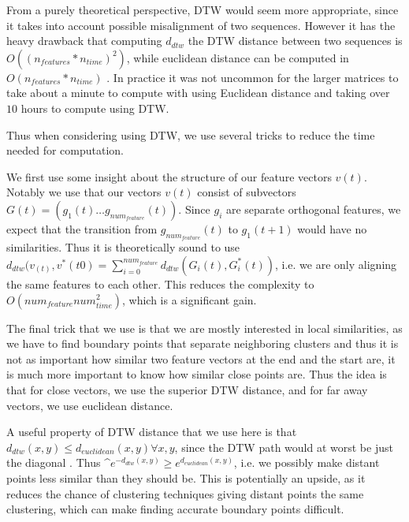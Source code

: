 From a purely theoretical perspective, DTW would seem more appropriate, since it takes into account possible misalignment of two sequences. However it has the heavy drawback that computing $d_{dtw}$ the DTW distance between two sequences is $O((n_{features}*n_{time})^2)$, while euclidean distance can be computed in $O(n_{features}*n_{time})$ . In practice it was not uncommon for the larger matrices to take about a minute to compute with using Euclidean distance and taking over $10$ hours to compute using DTW.

Thus when considering using DTW, we use several tricks to reduce the time needed for computation.

We first use some insight about the structure of our feature vectors $v(t)$. Notably we use that our vectors $v(t)$ consist of subvectors $G(t)=(g_1(t) \ldots g_{num_{feature}}(t))$. Since $g_i$ are separate orthogonal features, we expect that the transition from $g_{num_{feature}}(t)$ to $g_1(t+1)$ would have no similarities.  Thus it is theoretically sound to use $d_{dtw}(v_(t),v^*(t0)=\sum\limits_{i=0}^{num_{feature}} d_{dtw} (G_i(t),G^*_i (t))$, i.e. we are only aligning the same features to each other. This reduces the complexity to $O(num_{feature}num_{time}^2)$, which is a significant gain. 

The final trick that we use is that we are mostly interested in local similarities, as we have to find boundary points that separate neighboring clusters and thus it is not as important how similar two feature vectors at the end and the start are, it is much more important to know how similar close points are. Thus the idea is that for close vectors, we use the superior DTW distance, and for far away vectors, we use euclidean distance. 

A useful property of DTW distance that we use here is that $d_{dtw}(x,y)\leq d_{euclidean}(x,y) \forall x,y$, since  the DTW path would at worst be just the diagonal . Thus ^$e^{-d_{dtw}(x,y)}\geq e^{d_{euclidean}(x,y)}$, i.e. we possibly make distant points less similar than they should be. This is potentially an upside, as it reduces the chance of clustering techniques giving distant points the same clustering, which can make finding accurate boundary points difficult.

 

